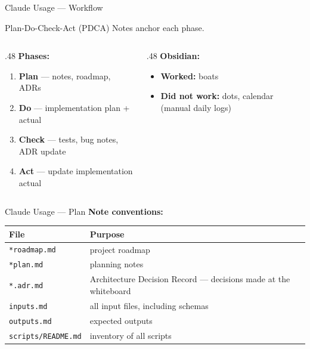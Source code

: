 \documentclass[xcolor,aspectratio=169,compress]{beamer}
\begin{document}
\begin{frame}{Claude Usage --- Workflow}
  \begin{block}{Plan-Do-Check-Act (PDCA)}
    \footnotesize Notes anchor each phase.
  \end{block}
  \smallskip
  \small
  \begin{columns}[t]
    \begin{column}{.48\textwidth}
      \textbf{Phases:}
      \begin{enumerate}\setlength{\itemsep}{2pt}
        \item \textbf{Plan} --- notes, roadmap, ADRs
        \item \textbf{Do} --- implementation plan + actual
        \item \textbf{Check} --- tests, bug notes, ADR update
        \item \textbf{Act} --- update implementation actual
      \end{enumerate}
    \end{column}
    \begin{column}{.48\textwidth}
      \textbf{Obsidian:}
      \begin{itemize}\setlength{\itemsep}{2pt}
        \item[$\checkmark$] \textbf{Worked:} boats
        \item[$\times$] \textbf{Did not work:} dots, calendar (manual daily logs)
      \end{itemize}
    \end{column}
  \end{columns}
\end{frame}

\begin{frame}{Claude Usage --- Plan}
  \small
  \textbf{Note conventions:}
  \smallskip

  \begin{tabular}{lp{7.5cm}}
    \toprule
    File & Purpose \\
    \midrule
    \texttt{*roadmap.md}       & project roadmap \\
    \texttt{*plan.md}          & planning notes \\
    \texttt{*.adr.md}          & Architecture Decision Record --- decisions made at the whiteboard \\
    \texttt{inputs.md}         & all input files, including schemas \\
    \texttt{outputs.md}        & expected outputs \\
    \texttt{scripts/README.md} & inventory of all scripts \\
    \bottomrule
  \end{tabular}
\end{frame}
\end{document}
